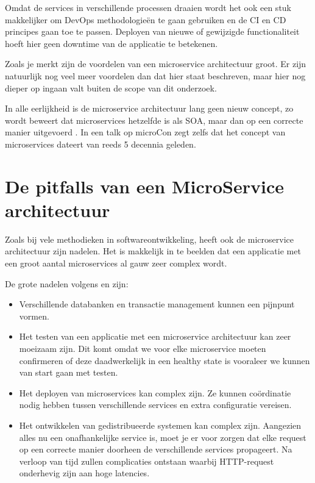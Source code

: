 Omdat de services in verschillende processen draaien wordt het ook een stuk makkelijker om DevOps methodologieën te gaan gebruiken en de \gls{CI} en \gls{CD} principes gaan toe te passen. Deployen van nieuwe of gewijzigde functionaliteit hoeft hier geen downtime van de applicatie te betekenen.

Zoals je merkt zijn de voordelen van een microservice architectuur groot. Er zijn natuurlijk nog veel meer voordelen dan dat hier staat beschreven, maar hier nog dieper op ingaan valt buiten de scope van dit onderzoek.

In alle eerlijkheid is de microservice architectuur lang geen nieuw concept, zo  wordt beweert dat microservices hetzelfde is als \gls{SOA}, maar dan op een correcte manier uitgevoerd \autocite{Morris2014} \autocite{Young2016}. In een talk op microCon zegt \textcite{Young2016} zelfs dat het concept van microservices dateert van reeds 5 decennia geleden.

\section{De pitfalls van een MicroService architectuur}
Zoals bij vele methodieken in softwareontwikkeling, heeft ook de microservice architectuur zijn nadelen. Het is makkelijk in te beelden dat een applicatie met een groot aantal microservices al gauw zeer complex wordt.

De grote nadelen volgens \textcite{Fowler2015} en \textcite{Hummel2018} zijn:

\begin{itemize}
	\item Verschillende databanken en transactie management kunnen een pijnpunt vormen.
	\item Het testen van een applicatie met een microservice architectuur kan zeer moeizaam zijn. Dit komt omdat we voor elke microservice moeten confirmeren of deze daadwerkelijk in een healthy state is vooraleer we kunnen van start gaan met testen.
	\item Het deployen van microservices kan complex zijn. Ze kunnen coördinatie nodig hebben tussen verschillende services en extra configuratie vereisen.
	\item Het ontwikkelen van \gls{gedistribueerde systemen} kan complex zijn. Aangezien alles nu een onafhankelijke service is, moet je er voor zorgen dat elke request op een correcte manier doorheen de verschillende services propageert. Na verloop van tijd zullen complicaties ontstaan waarbij \gls{HTTP-request} onderhevig zijn aan hoge latencies.
\end{itemize}


